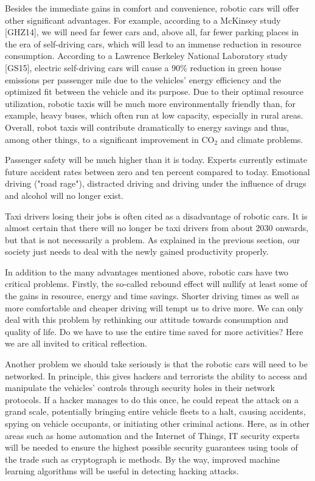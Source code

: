 \documentclass[10pt]{article}
\begin{document}
Besides the immediate gains in comfort and convenience, robotic cars will offer other significant advantages. For example, according to a McKinsey study [GHZ14], we will need far fewer cars and, above all, far fewer parking places in the era of self-driving cars, which will lead to an immense reduction in resource consumption. According to a Lawrence Berkeley National Laboratory study [GS15], electric self-driving cars will cause a $90 \%$ reduction in green house emissions per passenger mile due to the vehicles' energy efficiency and the optimized fit between the vehicle and its purpose. Due to their optimal resource utilization, robotic taxis will be much more environmentally friendly than, for example, heavy buses, which often run at low capacity, especially in rural areas. Overall, robot taxis will contribute dramatically to energy savings and thus, among other things, to a significant improvement in $\mathrm{CO}_{2}$ and climate problems.

Passenger safety will be much higher than it is today. Experts currently estimate future accident rates between zero and ten percent compared to today. Emotional driving ("road rage"), distracted driving and driving under the influence of drugs and alcohol will no longer exist.

Taxi drivers losing their jobs is often cited as a disadvantage of robotic cars. It is almost certain that there will no longer be taxi drivers from about 2030 onwards, but that is not necessarily a problem. As explained in the previous section, our society just needs to deal with the newly gained productivity properly.

In addition to the many advantages mentioned above, robotic cars have two critical problems. Firstly, the so-called rebound effect will nullify at least some of the gains in resource, energy and time savings. Shorter driving times as well as more comfortable and cheaper driving will tempt us to drive more. We can only deal with this problem by rethinking our attitude towards consumption and quality of life. Do we have to use the entire time saved for more activities? Here we are all invited to critical reflection.

Another problem we should take seriously is that the robotic cars will need to be networked. In principle, this gives hackers and terrorists the ability to access and manipulate the vehicles' controls through security holes in their network protocols. If a hacker manages to do this once, he could repeat the attack on a grand scale, potentially bringing entire vehicle fleets to a halt, causing accidents, spying on vehicle occupants, or initiating other criminal actions. Here, as in other areas such as home automation and the Internet of Things, IT security experts will be needed to ensure the highest possible security guarantees using tools of the trade such as cryptograph
ic methods. By the way, improved machine learning algorithms will be useful in detecting hacking attacks.
\end{document}
